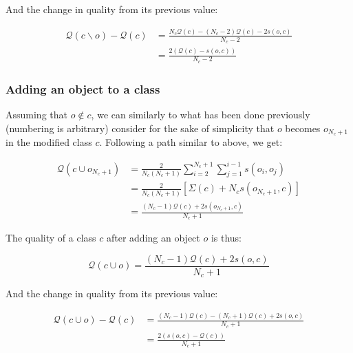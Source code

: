 \documentclass[a4paper,twoside]{article}
\begin{document}
And the change in quality from its previous value:

\begin{equation} \label{deltaRemove}
  \begin{aligned}
    \mathcal{Q}\left(c \smallsetminus o\right) - \mathcal{Q}\left(c\right) & = \frac{N_c \mathcal{Q}(c)  - (N_c-2) \mathcal{Q}(c)  - 2s\left(o, c\right)}{N_c-2} \\
                                                                           & = \frac{2\left( \mathcal{Q}(c) - s\left(o, c\right)\right)}{N_c-2}
    \end{aligned}
\end{equation}


\subsubsection{Adding an object to a class}

Assuming that $o \notin c$, we can similarly to what has been done previously (numbering is arbitrary) consider for the sake of simplicity that $o$ becomes $o_{N_c+1}$ in the modified class $c$. Following a path similar to above, we get:

\begin{equation}
  \begin{aligned}
    \mathcal{Q}(c \cup o_{N_c+1}) & = \frac{2}{N_c(N_c+1)} \sum_{i=2}^{N_c+1} \sum_{j=1}^{i-1} s\left(o_i, o_j\right) \\
                                & = \frac{2}{N_c(N_c+1)} \left[\Sigma(c) + N_c s\left(o_{N_c+1}, c\right)\right] \\
                                & = \frac{(N_c-1) \mathcal{Q}(c)  + 2s\left(o_{N_c+1}, c\right)}{N_c+1}
  \end{aligned}
\end{equation}

\noindent The quality of a class $c$ after adding an object $o$ is thus:

\begin{equation}
  \mathcal{Q}\left(c \cup o\right) = \frac{(N_c-1) \mathcal{Q}(c)  + 2s\left(o, c\right)}{N_c+1}
  \label{eq:newQual_add}
\end{equation}

\noindent And the change in quality from its previous value:

\begin{equation} \label{deltaAdd}
  \begin{aligned}
    \mathcal{Q}\left(c \cup o\right) - \mathcal{Q}\left(c\right) & = \frac{(N_c-1) \mathcal{Q}(c)  - (N_c+1) \mathcal{Q}(c)  + 2s\left(o, c\right)}{N_c+1} \\
                                                                           & = \frac{2\left(s\left(o, c\right)-\mathcal{Q}(c)\right)}{N_c+1}
    \end{aligned}
\end{equation}
\end{document}
